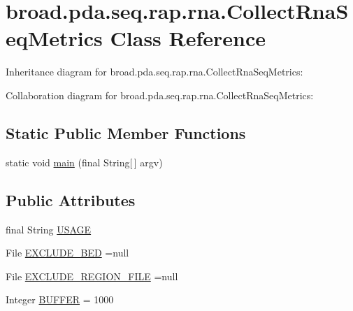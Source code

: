 \hypertarget{classbroad_1_1pda_1_1seq_1_1rap_1_1rna_1_1_collect_rna_seq_metrics}{\section{broad.\+pda.\+seq.\+rap.\+rna.\+Collect\+Rna\+Seq\+Metrics Class Reference}
\label{classbroad_1_1pda_1_1seq_1_1rap_1_1rna_1_1_collect_rna_seq_metrics}
}


Inheritance diagram for broad.\+pda.\+seq.\+rap.\+rna.\+Collect\+Rna\+Seq\+Metrics\+:


Collaboration diagram for broad.\+pda.\+seq.\+rap.\+rna.\+Collect\+Rna\+Seq\+Metrics\+:
\subsection*{Static Public Member Functions}
\begin{DoxyCompactItemize}
\item 
static void \hyperlink{classbroad_1_1pda_1_1seq_1_1rap_1_1rna_1_1_collect_rna_seq_metrics_a9016b9b5e6c5d19c2d0d658991c71962}{main} (final String\mbox{[}$\,$\mbox{]} argv)
\end{DoxyCompactItemize}
\subsection*{Public Attributes}
\begin{DoxyCompactItemize}
\item 
final String \hyperlink{classbroad_1_1pda_1_1seq_1_1rap_1_1rna_1_1_collect_rna_seq_metrics_ac9fff20f8e876587194d968240cf9a20}{U\+S\+A\+G\+E}
\item 
File \hyperlink{classbroad_1_1pda_1_1seq_1_1rap_1_1rna_1_1_collect_rna_seq_metrics_a4b1f1917c05e3886f0a9ead10c0aa3a4}{E\+X\+C\+L\+U\+D\+E\+\_\+\+B\+E\+D} =null
\item 
File \hyperlink{classbroad_1_1pda_1_1seq_1_1rap_1_1rna_1_1_collect_rna_seq_metrics_a4c1fb46741008d51e8d4bde3a1aad351}{E\+X\+C\+L\+U\+D\+E\+\_\+\+R\+E\+G\+I\+O\+N\+\_\+\+F\+I\+L\+E} =null
\item 
Integer \hyperlink{classbroad_1_1pda_1_1seq_1_1rap_1_1rna_1_1_collect_rna_seq_metrics_a5cc9cf46c9e34b6f4bbb56b810bf1345}{B\+U\+F\+F\+E\+R} = 1000
\end{DoxyCompactItemize}
